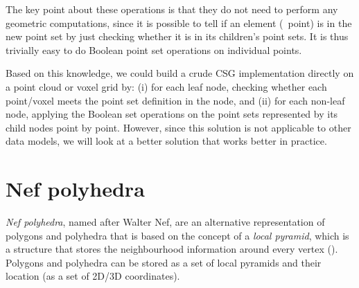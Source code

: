 The key point about these operations is that they do not need to perform any geometric computations, since it is possible to tell if an element (\ie\ point) is in the new point set by just checking whether it is in its children's point sets.
It is thus trivially easy to do Boolean point set operations on individual points.

Based on this knowledge, we could build a crude CSG implementation directly on a point cloud or voxel grid by: (i) for each leaf node, checking whether each point/voxel meets the point set definition in the node, and (ii) for each non-leaf node, applying the Boolean set operations on the point sets represented by its child nodes point by point.
However, since this solution is not applicable to other data models, we will look at a better solution that works better in practice.

\section{Nef polyhedra}

\emph{Nef polyhedra}, named after Walter Nef, are an alternative representation of polygons and polyhedra that is based on the concept of a \emph{local pyramid}, which is a structure that stores the neighbourhood information around every vertex ().
Polygons and polyhedra can be stored as a set of local pyramids and their location (as a set of 2D/3D coordinates).

